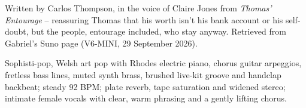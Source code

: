 
\begin{notes}
Written by Carlos Thompson, in the voice of Claire Jones from \emph{Thomas' Entourage} -- reassuring Thomas that his worth isn't his bank account or his self-doubt, but the people, entourage included, who stay anyway. Retrieved from Gabriel's Suno page (V6-MINI, 29 September 2026).
\end{notes}
\begin{style}
Sophisti-pop, Welsh art pop with Rhodes electric piano, chorus guitar arpeggios, fretless bass lines, muted synth brass, brushed live-kit groove and handclap backbeat; steady 92 BPM; plate reverb, tape saturation and widened stereo; intimate female vocals with clear, warm phrasing and a gently lifting chorus.
\end{style}
